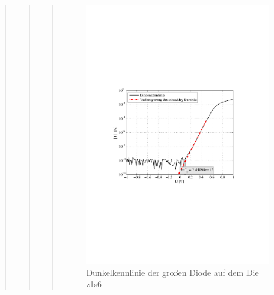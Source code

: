 \begin{quote}
\begin{quote}
\begin{quote}
            \begin{figure}[H]
                \centering
                \includegraphics[scale=0.7, trim = 3.1cm 9.2cm 4cm 8.5cm, clip]{KennlinienBilder/dunkel_kennlinie_z1_s6.pdf}
                \caption{Dunkelkennlinie der großen Diode auf dem Die z1s6}
                \label{fig:dunkel_kennlinie_z1_s6.pdf}
            \end{figure}



\end{quote}
\end{quote}
\end{quote}
